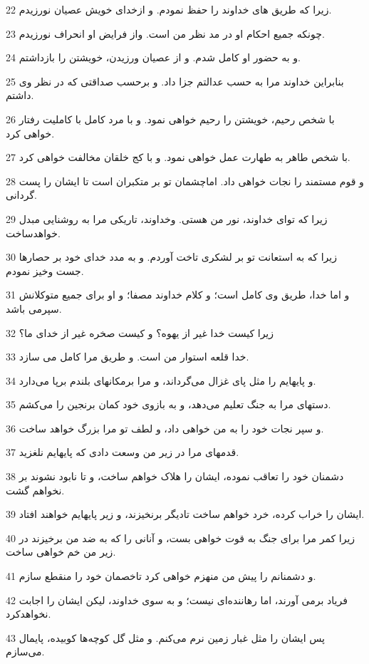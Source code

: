 \par 22 زیرا که طریق های خداوند را حفظ نمودم. و ازخدای خویش عصیان نورزیدم.
\par 23 چونکه جمیع احکام او در مد نظر من است. واز فرایض او انحراف نورزیدم.
\par 24 و به حضور او کامل شدم. و از عصیان ورزیدن، خویشتن را بازداشتم.
\par 25 بنابراین خداوند مرا به حسب عدالتم جزا داد. و بر‌حسب صداقتی که در نظر وی داشتم.
\par 26 با شخص رحیم، خویشتن را رحیم خواهی نمود. و با مرد کامل با کاملیت رفتار خواهی کرد.
\par 27 با شخص طاهر به طهارت عمل خواهی نمود. و با کج خلقان مخالفت خواهی کرد.
\par 28 و قوم مستمند را نجات خواهی داد. اماچشمان تو بر متکبران است تا ایشان را پست گردانی.
\par 29 زیرا که تو‌ای خداوند، نور من هستی. وخداوند، تاریکی مرا به روشنایی مبدل خواهدساخت.
\par 30 زیرا که به استعانت تو بر لشکری تاخت آوردم. و به مدد خدای خود بر حصارها جست وخیز نمودم.
\par 31 و اما خدا، طریق وی کامل است؛ و کلام خداوند مصفا؛ و او برای جمیع متوکلانش سپرمی باشد.
\par 32 زیرا کیست خدا غیر از یهوه؟ و کیست صخره غیر از خدای ما؟
\par 33 خدا قلعه استوار من است. و طریق مرا کامل می سازد.
\par 34 و پایهایم را مثل پای غزال می‌گرداند، و مرا برمکانهای بلندم برپا می‌دارد.
\par 35 دستهای مرا به جنگ تعلیم می‌دهد، و به بازوی خود کمان برنجین را می‌کشم.
\par 36 و سپر نجات خود را به من خواهی داد، و لطف تو مرا بزرگ خواهد ساخت.
\par 37 قدمهای مرا در زیر من وسعت دادی که پایهایم نلغزید.
\par 38 دشمنان خود را تعاقب نموده، ایشان را هلاک خواهم ساخت، و تا نابود نشوند بر نخواهم گشت.
\par 39 ایشان را خراب کرده، خرد خواهم ساخت تادیگر برنخیزند، و زیر پایهایم خواهند افتاد.
\par 40 زیرا کمر مرا برای جنگ به قوت خواهی بست، و آنانی را که به ضد من برخیزند در زیر من خم خواهی ساخت.
\par 41 و دشمنانم را پیش من منهزم خواهی کرد تاخصمان خود را منقطع سازم.
\par 42 فریاد برمی آورند، اما رهاننده‌ای نیست؛ و به سوی خداوند، لیکن ایشان را اجابت نخواهدکرد.
\par 43 پس ایشان را مثل غبار زمین نرم می‌کنم. و مثل گل کوچه‌ها کوبیده، پایمال می‌سازم.
